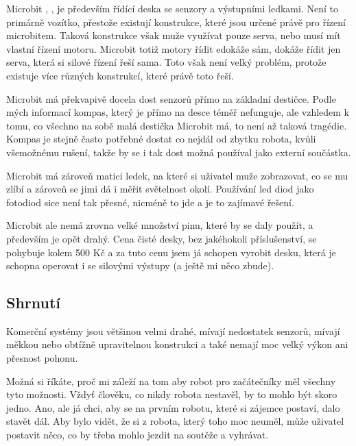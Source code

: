 \documentclass{template/socthesis}
\begin{document}
Microbit \cite{Microbit1}, \cite{Microbit2}, \cite{Microbit3} je především řídící deska se senzory a výstupními ledkami. Není to primárně vozítko, přestože existují konstrukce, které jsou určené právě pro řízení microbitem. Taková konstrukce však muže využívat pouze serva, nebo musí mít vlastní řízení motoru. Microbit totiž motory řídit edokáže sám, dokáže řídit jen serva, která si silové řízení řeší sama. Toto však není velký problém, protože existuje více různých konstrukcí, které právě toto řeší. 

Microbit má překvapivě docela dost senzorů přímo na základní destičce. Podle mých informací kompas, který je přímo na desce téměř nefunguje, ale vzhledem k tomu, co všechno na sobě malá destička Microbit má, to není až taková tragédie. Kompas je stejně často potřebné dostat co nejdál od zbytku robota, kvůli všemožnému rušení, takže by se i tak dost možná používal jako externí součástka.

Microbit má zároveň matici ledek, na které si uživatel muže zobrazovat, co se mu zlíbí a zároveň se jimi dá i měřit světelnost okolí. Používání led diod jako fotodiod sice není tak přesné, nicméně to jde a je to zajímavé řešení.

Microbit ale nemá zrovna velké množství pinu, které by se daly použít, a především je opět drahý. Cena čisté desky, bez jakéhokoli příslušenství, se pohybuje kolem 500 Kč a za tuto cenu jsem já schopen vyrobit desku, která je schopna operovat i se silovými výstupy (a ještě mi něco zbude).

\subsection{Shrnutí}
Komerční systémy jsou většinou velmi drahé, mívají nedostatek senzorů, mívají měkkou nebo obtížně upravitelnou konstrukci a také nemají moc velký výkon ani přesnost pohonu.

Možná si říkáte, proč mi záleží na tom aby robot pro začátečníky měl všechny tyto možnosti. Vždyť člověku, co nikdy robota nestavěl, by to mohlo být skoro jedno. Ano, ale já chci, aby se na prvním robotu, které si zájemce postaví, dalo stavět dál. Aby bylo vidět, že si z robota, který toho moc neuměl, může uživatel postavit něco, co by třeba mohlo jezdit na soutěže a vyhrávat.
\end{document}
